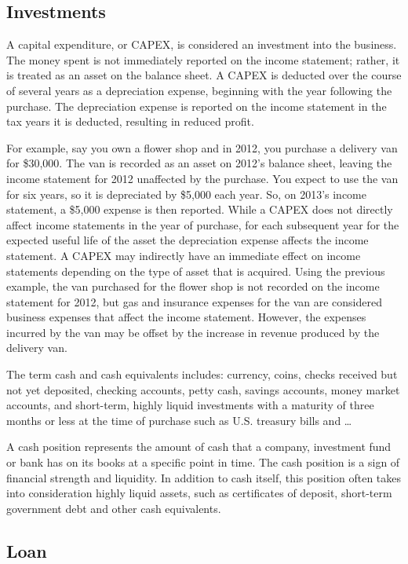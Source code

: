 \documentclass[]{book}
\theoremstyle{definition}
\theoremstyle{definition}
\theoremstyle{definition}
\theoremstyle{remark}
\begin{document}
\subsection{Investments}\label{investments}

A capital expenditure, or CAPEX, is considered an investment into the
business. The money spent is not immediately reported on the income
statement; rather, it is treated as an asset on the balance sheet. A
CAPEX is deducted over the course of several years as a depreciation
expense, beginning with the year following the purchase. The
depreciation expense is reported on the income statement in the tax
years it is deducted, resulting in reduced profit.

For example, say you own a flower shop and in 2012, you purchase a
delivery van for \$30,000. The van is recorded as an asset on 2012's
balance sheet, leaving the income statement for 2012 unaffected by the
purchase. You expect to use the van for six years, so it is depreciated
by \$5,000 each year. So, on 2013's income statement, a \$5,000 expense
is then reported. While a CAPEX does not directly affect income
statements in the year of purchase, for each subsequent year for the
expected useful life of the asset the depreciation expense affects the
income statement. A CAPEX may indirectly have an immediate effect on
income statements depending on the type of asset that is acquired. Using
the previous example, the van purchased for the flower shop is not
recorded on the income statement for 2012, but gas and insurance
expenses for the van are considered business expenses that affect the
income statement. However, the expenses incurred by the van may be
offset by the increase in revenue produced by the delivery van.

The term cash and cash equivalents includes: currency, coins, checks
received but not yet deposited, checking accounts, petty cash, savings
accounts, money market accounts, and short-term, highly liquid
investments with a maturity of three months or less at the time of
purchase such as U.S. treasury bills and \ldots{}

A cash position represents the amount of cash that a company, investment
fund or bank has on its books at a specific point in time. The cash
position is a sign of financial strength and liquidity. In addition to
cash itself, this position often takes into consideration highly liquid
assets, such as certificates of deposit, short-term government debt and
other cash equivalents.

\subsection{Loan}\label{loan}
\end{document}
